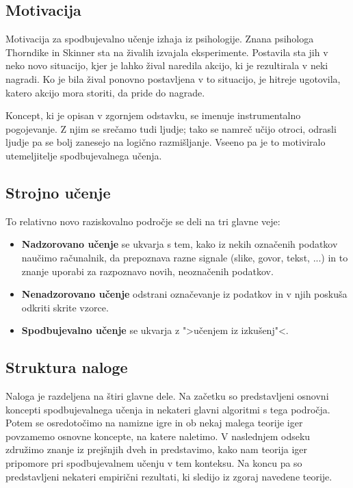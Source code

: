 \documentclass[12pt,a4paper]{amsart}
\theoremstyle{definition} %
\theoremstyle{plain} %
\begin{document}
\subsection{Motivacija}
Motivacija za spodbujevalno učenje izhaja iz psihologije. Znana psihologa 
Thorndike in Skinner sta na živalih izvajala eksperimente. Postavila sta jih v neko novo 
situacijo, kjer je lahko žival naredila akcijo, ki je rezultirala v neki nagradi. Ko je bila
žival ponovno postavljena v to situacijo, je hitreje ugotovila, katero akcijo mora storiti, da
pride do nagrade.

Koncept, ki je opisan v zgornjem odstavku, se imenuje instrumentalno pogojevanje. Z njim se 
srečamo tudi ljudje; tako se namreč učijo otroci, odrasli ljudje pa se bolj zanesejo na 
logično razmišljanje. Vseeno pa je to motiviralo utemeljitelje spodbujevalnega učenja.

\subsection{Strojno učenje}
To relativno novo raziskovalno področje se deli na tri glavne veje:
\begin{itemize}
    \item \textbf{Nadzorovano učenje} se ukvarja s tem, kako iz nekih označenih podatkov 
            naučimo računalnik, da prepoznava razne signale (slike, govor, tekst, ...)
            in to znanje uporabi za razpoznavo novih, neoznačenih podatkov.
    \item \textbf{Nenadzorovano učenje} odstrani označevanje iz podatkov in v njih poskuša 
            odkriti skrite vzorce.
    \item \textbf{Spodbujevalno učenje} se ukvarja z ">učenjem iz izkušenj"<.
\end{itemize}

\subsection{Struktura naloge}
Naloga je razdeljena na štiri glavne dele. Na začetku so predstavljeni osnovni koncepti 
spodbujevalnega učenja in nekateri glavni algoritmi s tega področja. Potem se osredotočimo na 
namizne igre in ob nekaj malega teorije iger povzamemo osnovne koncepte, na katere naletimo. 
V naslednjem odseku združimo znanje iz prejšnjih dveh in predstavimo, kako nam teorija iger 
pripomore pri spodbujevalnem učenju v tem konteksu. Na koncu pa so predstavljeni nekateri empirični
rezultati, ki sledijo iz zgoraj navedene teorije.
\end{document}
